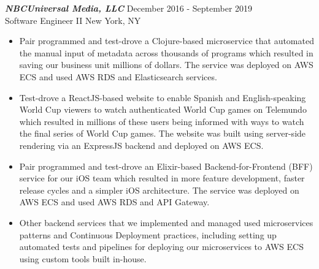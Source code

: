 {\sl \textbf{NBCUniversal Media, LLC}} \hfill December 2016 - September 2019 \\ Software Engineer II \hfill New York, NY
\begin{itemize}
\item Pair programmed and test-drove a Clojure-based microservice that automated the manual input of metadata across thousands of programs which resulted in saving our business unit millions of dollars. The service was deployed on AWS ECS and used AWS RDS and Elasticsearch services.
\item Test-drove a ReactJS-based website to enable Spanish and English-speaking World Cup viewers to watch authenticated World Cup games on Telemundo which resulted in millions of these users being informed with ways to watch the final series of World Cup games. The website was built using server-side rendering via an ExpressJS backend and deployed on AWS ECS.
\item Pair programmed and test-drove an Elixir-based Backend-for-Frontend (BFF) service for our iOS team which resulted in more feature development, faster release cycles and a simpler iOS architecture. The service was deployed on AWS ECS and used AWS RDS and API Gateway.
\item Other backend services that we implemented and managed used microservices patterns and Continuous Deployment practices, including setting up automated tests and pipelines for deploying our microservices to AWS ECS using custom tools built in-house.
\end{itemize}
